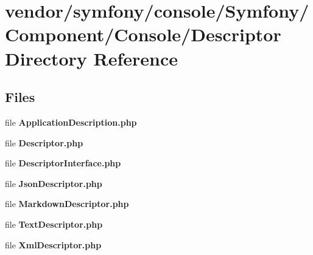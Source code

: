\section{vendor/symfony/console/\+Symfony/\+Component/\+Console/\+Descriptor Directory Reference}
\label{dir_37c1cadf71aebeb03ec3151475478cbb}
\subsection*{Files}
\begin{DoxyCompactItemize}
\item 
file {\bf Application\+Description.\+php}
\item 
file {\bf Descriptor.\+php}
\item 
file {\bf Descriptor\+Interface.\+php}
\item 
file {\bf Json\+Descriptor.\+php}
\item 
file {\bf Markdown\+Descriptor.\+php}
\item 
file {\bf Text\+Descriptor.\+php}
\item 
file {\bf Xml\+Descriptor.\+php}
\end{DoxyCompactItemize}
